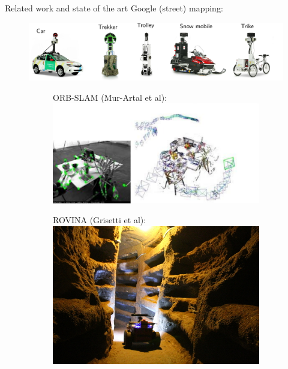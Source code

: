 \documentclass[11pt]{beamer}
\begin{document}
\begin{frame}{Related work and state of the art}
Google (street) mapping:
\begin{figure}[!htb]
\centering
\includegraphics[width=\textwidth]{figures/introduction/google_fleet.pdf}
\vspace{10pt}
\begin{subfigure}[b]{0.45\textwidth}
ORB-SLAM (Mur-Artal et al):
 \includegraphics[width=\textwidth]{figures/introduction/ORB_SLAM.pdf}
\end{subfigure}
\hfill
\begin{subfigure}[b]{0.4\textwidth}
ROVINA (Grisetti et al):
 \includegraphics[width=\textwidth]{figures/introduction/ROVINA.jpg}
\end{subfigure}
\end{figure}
\end{frame}
\end{document}
